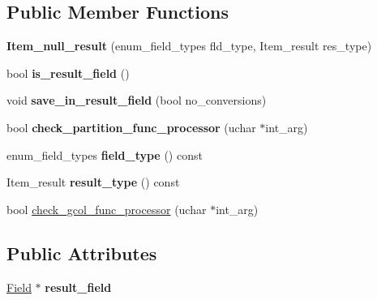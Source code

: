 \subsection*{Public Member Functions}
\begin{DoxyCompactItemize}
\item 
\mbox{\label{classItem__null__result_ac719d636a8c32791369457f16e5c376a}} 
{\bfseries Item\+\_\+null\+\_\+result} (enum\+\_\+field\+\_\+types fld\+\_\+type, Item\+\_\+result res\+\_\+type)
\item 
\mbox{\label{classItem__null__result_a7b94e2f3ada5773c7fc795aac7afe0c4}} 
bool {\bfseries is\+\_\+result\+\_\+field} ()
\item 
\mbox{\label{classItem__null__result_a803965c064d17bf88261b553d2c04dea}} 
void {\bfseries save\+\_\+in\+\_\+result\+\_\+field} (bool no\+\_\+conversions)
\item 
\mbox{\label{classItem__null__result_ac2b067d6da3cfefd43f9aca479e925f9}} 
bool {\bfseries check\+\_\+partition\+\_\+func\+\_\+processor} (uchar $\ast$int\+\_\+arg)
\item 
\mbox{\label{classItem__null__result_a1e6071b25a6f1520abf1ff3f28107e22}} 
enum\+\_\+field\+\_\+types {\bfseries field\+\_\+type} () const
\item 
\mbox{\label{classItem__null__result_a8355283cd65a83091bdc0f132e8c42d1}} 
Item\+\_\+result {\bfseries result\+\_\+type} () const
\item 
bool \mbox{\hyperlink{classItem__null__result_a2e623724f3729cea2a1b54c3d5f7dbd4}{check\+\_\+gcol\+\_\+func\+\_\+processor}} (uchar $\ast$int\+\_\+arg)
\end{DoxyCompactItemize}
\subsection*{Public Attributes}
\begin{DoxyCompactItemize}
\item 
\mbox{\label{classItem__null__result_a238e87402e00c49bda7d31475dda949a}} 
\mbox{\hyperlink{classField}{Field}} $\ast$ {\bfseries result\+\_\+field}
\end{DoxyCompactItemize}
